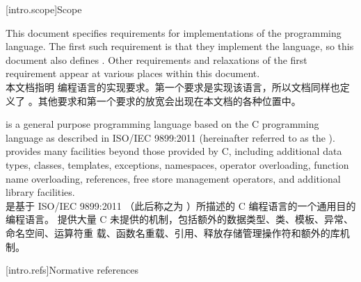 
[intro.scope]{Scope}

\pnum
{}%
This document specifies requirements for implementations
of the \Cpp{} programming language. The first such requirement is that
they implement the language, so this document also
defines \Cpp{}. Other requirements and relaxations of the first
requirement appear at various places within this document.\\
本文档指明 \Cpp{} 编程语言的实现要求。第一个要求是实现该语言，所以文档同样也定义了
\Cpp{}。其他要求和第一个要求的放宽会出现在本文档的各种位置中。

\pnum
\Cpp{} is a general purpose programming language based on the C
programming language as described in ISO/IEC 9899:2011
 (hereinafter referred to as the
). \Cpp{} provides many facilities
beyond those provided by C, including additional data types,
classes, templates, exceptions, namespaces, operator
overloading, function name overloading, references, free store
management operators, and additional library facilities.%
\\
\Cpp{} 是基于 ISO/IEC 9899:2011  
（此后称之为 ）所描述的 C 编程语言的一个通用目的编程语言。
\Cpp{} 提供大量 C 未提供的机制，包括额外的数据类型、类、模板、异常、命名空间、运算符重
载、函数名重载、引用、释放存储管理操作符和额外的库机制。%


%
[intro.refs]{Normative references}

